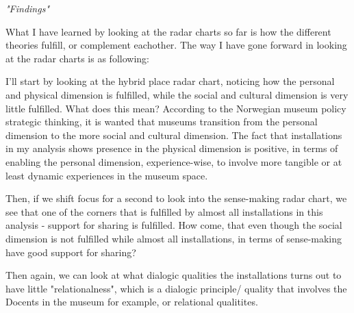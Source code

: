 \emph{"Findings"}
\par

What I have learned by looking at the radar charts so far is how the different theories fulfill, or complement eachother. The way I have gone forward in looking at the radar charts is as following:
\par I'll start by looking at the hybrid place radar chart, noticing how the personal and physical dimension is fulfilled, while the social and cultural dimension is very little fulfilled. What does this mean? According to the Norwegian museum policy strategic thinking, it is wanted that museums transition from the personal dimension to the more social and cultural dimension. The fact that installations in my analysis shows presence in the physical dimension is positive, in terms of enabling the personal dimension, experience-wise, to involve more tangible or at least dynamic experiences in the museum space.
\par Then, if we shift focus for a second to look into the sense-making radar chart, we see that one of the corners that is fulfilled by almost all installations in this analysis - support for sharing is fulfilled. How come, that even though the social dimension is not fulfilled while almost all installations, in terms of sense-making have good support for sharing? 

\par Then again, we can look at what dialogic qualities the installations turns out to have little "relationalness", which is a dialogic principle/ quality that involves the Docents in the museum for example, or relational qualitites.


